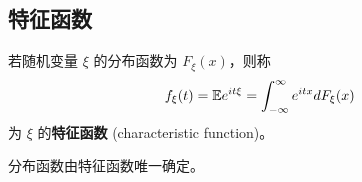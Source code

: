 \subsection{特征函数}\label{subsec:特征函数}
\begin{definition}[特征函数] \label{def:characteristic_function}
若随机变量 $\xi$ 的分布函数为 $F_\xi(x)$，则称
\begin{equation} \label{eq:characteristic_function_formula}
f_\xi(t) = \mathbb{E} e^{it\xi} = \int_{-\infty}^\infty e^{itx} dF_\xi(x)
\end{equation}
为 $\xi$ 的\textbf{特征函数} (characteristic function)。
\end{definition}
\begin{remark}
    分布函数由特征函数唯一确定。
\end{remark}